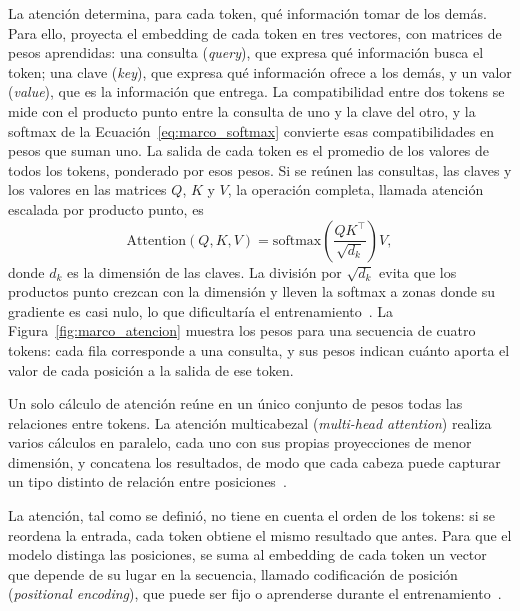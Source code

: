 La atención determina, para cada token, qué información tomar de los demás. Para ello, proyecta el
embedding de cada token en tres vectores, con matrices de pesos aprendidas: una consulta
(\emph{query}), que expresa qué información busca el token; una clave (\emph{key}), que expresa qué
información ofrece a los demás, y un valor (\emph{value}), que es la información que entrega. La compatibilidad
entre dos tokens se mide con el producto punto entre la consulta de uno y la clave del otro, y la
softmax de la Ecuación~\ref{eq:marco_softmax} convierte esas compatibilidades en pesos que suman uno. La salida
de cada token es el promedio de los valores de todos los tokens, ponderado por esos pesos. Si se
reúnen las consultas, las claves y los valores en las matrices $Q$, $K$ y $V$, la operación completa, llamada
atención escalada por producto punto, es
\begin{equation}
    \mathrm{Attention}(Q, K, V) = \mathrm{softmax}\!\left(\frac{QK^{\top}}{\sqrt{d_k}}\right) V,
    \label{eq:marco_atencion}
\end{equation}
donde $d_k$ es la dimensión de las claves. La división por $\sqrt{d_k}$ evita que los productos punto crezcan
con la dimensión y lleven la softmax a zonas donde su gradiente es casi nulo, lo que dificultaría el
entrenamiento~\cite{vaswani2017attention}. La Figura~\ref{fig:marco_atencion} muestra los pesos para una
secuencia de cuatro tokens: cada fila corresponde a una consulta, y sus pesos indican cuánto aporta el
valor de cada posición a la salida de ese token.



Un solo cálculo de atención reúne en un único conjunto de pesos todas las relaciones entre tokens. La
atención multicabezal (\emph{multi-head attention}) realiza varios cálculos en paralelo, cada uno con sus
propias proyecciones de menor dimensión, y concatena los resultados, de modo que cada cabeza puede capturar un
tipo distinto de relación entre posiciones~\cite{vaswani2017attention}.

La atención, tal como se definió, no tiene en cuenta el orden de los tokens: si se reordena la entrada,
cada token obtiene el mismo resultado que antes. Para que el modelo distinga las posiciones, se suma al
embedding de cada token un vector que depende de su lugar en la secuencia, llamado codificación de
posición (\emph{positional encoding}), que puede ser fijo o aprenderse durante el
entrenamiento~\cite{vaswani2017attention,dosovitskiy2021image}.

